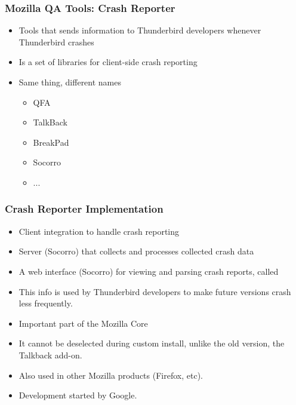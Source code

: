 \documentclass{beamer}
\begin{document}
\begin{frame}
 \frametitle{Mozilla QA Tools: Crash Reporter}
 \begin{itemize}
 \item Tools that sends information to Thunderbird developers whenever Thunderbird crashes
 \item Is a set of libraries for client-side crash reporting
 \item Same thing, different names
    \begin{itemize}
     \item QFA
     \item TalkBack
     \item BreakPad
     \item Socorro
     \item ...
    \end{itemize}
 \end{itemize}
\end{frame}


\begin{frame}
 \frametitle{Crash Reporter Implementation}
 \begin{itemize}
   \item Client integration to handle crash reporting 
   \item Server (Socorro) that collects and processes collected crash data
   \item A web interface (Socorro) for viewing and parsing crash reports, called
   \item This info is used by Thunderbird developers to make future versions crash less frequently. 
   \item Important part of the Mozilla Core
   \item It cannot be deselected during custom install, unlike the old version, the Talkback add-on.
   \item Also used in other Mozilla products (Firefox, etc).
   \item Development started by Google.
 \end{itemize}
\end{frame}

\end{document}
